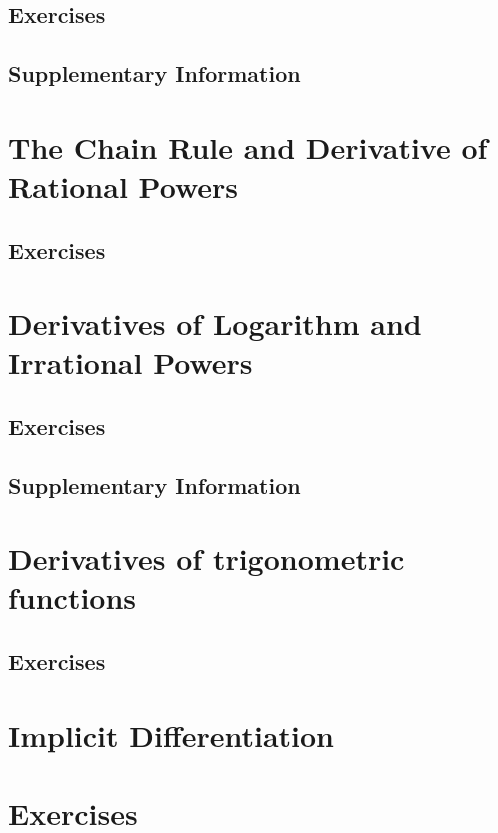 \documentclass{fts_m2}
\begin{document}
    \subsection*{Exercises}
    
    \ifcompilesupp
    \subsection*{Supplementary Information}
    
    \fi

    \section{The Chain Rule and Derivative of Rational Powers}
    
    \subsection*{Exercises}
    

    \section{Derivatives of Logarithm and Irrational Powers}
    
    \subsection*{Exercises}
    
    \ifcompilesupp
    \subsection*{Supplementary Information}
    
    \fi
    
    \section{Derivatives of trigonometric functions}
    
    \ifcompilesupp
    \subsection*{Exercises}
    
    \fi
    
    \section{Implicit Differentiation}
    
    \section*{Exercises}
    
\end{document}
